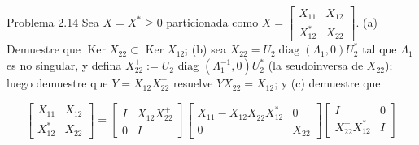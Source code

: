 \documentclass[11pt]{article}
\begin{document}
Problema 2.14 Sea $X=X^{*} \geq 0$ particionada como $X=\left[\begin{array}{ll}X_{11} & X_{12} \\ X_{12}^{*} & X_{22}\end{array}\right]$. (a) Demuestre que $\operatorname{Ker} X_{22} \subset \operatorname{Ker} X_{12}$; (b) sea $X_{22}=U_{2} \operatorname{diag}\left(\Lambda_{1}, 0\right) U_{2}^{*}$ tal que $\Lambda_{1}$ es no singular, y defina $X_{22}^{+}:=U_{2}$ diag $\left(\Lambda_{1}^{-1}, 0\right) U_{2}^{*}$ (la seudoinversa de $X_{22}$); luego demuestre que $Y=X_{12} X_{22}^{+}$ resuelve $Y X_{22}=X_{12}$; y (c) demuestre que

$$
\left[\begin{array}{ll}
X_{11} & X_{12} \\
X_{12}^{*} & X_{22}
\end{array}\right]=\left[\begin{array}{cc}
I & X_{12} X_{22}^{+} \\
0 & I
\end{array}\right]\left[\begin{array}{cc}
X_{11}-X_{12} X_{22}^{+} X_{12}^{*} & 0 \\
0 & X_{22}
\end{array}\right]\left[\begin{array}{cc}
I & 0 \\
X_{22}^{+} X_{12}^{*} & I
\end{array}\right]
$$
\end{document}
